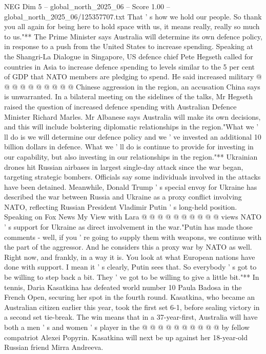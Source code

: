 \begin{textsample}{NEG Dim 5 – global\_north\_2025\_06 – Score 1.00 – global\_north\_2025\_06/125357707.txt}
That ' s how we hold our people.
So thank you all again for being here to hold space with us, it means really, really so much to us."** The Prime Minister says Australia will determine its own defence policy, in response to a push from the United States to increase spending.
Speaking at the Shangri-La Dialogue in Singapore, US defence chief Pete Hegseth called for countries in Asia to increase defence spending to levels similar to the 5 per cent of GDP that NATO members are pledging to spend.
He said increased military @ @ @ @ @ @ @ @ @ @ Chinese aggression in the region, an accusation China says is unwarranted.
In a bilateral meeting on the sidelines of the talks, Mr Hegseth raised the question of increased defence spending with Australian Defence Minister Richard Marles.
Mr Albanese says Australia will make its own decisions, and this will include bolstering diplomatic relationships in the region."What we ' ll do is we will determine our defence policy and we ' ve invested an additional 10 billion dollars in defence.
What we ' ll do is continue to provide for investing in our capability, but also investing in our relationships in the region."** Ukrainian drones hit Russian airbases in largest single-day attack since the war began, targeting strategic bombers.
Officials say some individuals involved in the attacks have been detained.
Meanwhile, Donald Trump ' s special envoy for Ukraine has described the war between Russia and Ukraine as a proxy conflict involving NATO, reflecting Russian President Vladimir Putin ' s long-held position.
Speaking on Fox News My View with Lara @ @ @ @ @ @ @ @ @ @ views NATO ' s support for Ukraine as direct involvement in the war."Putin has made those comments - well, if you ' re going to supply them with weapons, we continue with the part of the aggressor.
And he considers this a proxy war by NATO as well.
Right now, and frankly, in a way it is.
You look at what European nations have done with support.
I mean it ' s clearly, Putin sees that.
So everybody ' s got to be willing to step back a bit.
They ' ve got to be willing to give a little bit."** In tennis, Daria Kasatkina has defeated world number 10 Paula Badosa in the French Open, securing her spot in the fourth round.
Kasatkina, who became an Australian citizen earlier this year, took the first set 6-1, before sealing victory in a second set tie-break.
The win means that in a 37-year-first, Australia will have both a men ' s and women ' s player in the @ @ @ @ @ @ @ @ @ @ by fellow compatriot Alexei Popyrin.
Kasatkina will next be up against her 18-year-old Russian friend Mirra Andreeva.

\end{textsample}
